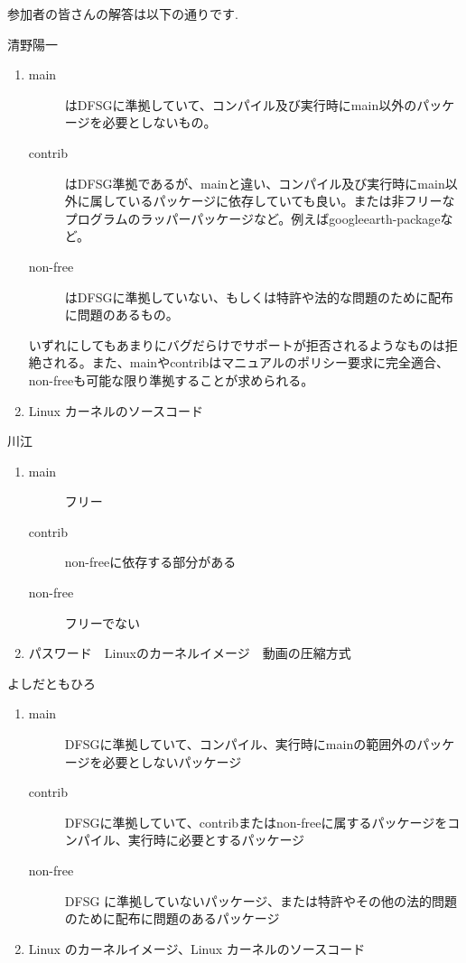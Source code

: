 \documentclass[mingoth,a4paper]{jsarticle}
\begin{document}
参加者の皆さんの解答は以下の通りです.

\begin{prework}{  清野陽一 }
  \begin{enumerate}
  \item
    \begin{description}
    \item [main]はDFSGに準拠していて、コンパイル及び実行時にmain以外のパッケージを必要としないもの。
    \item [contrib]はDFSG準拠であるが、mainと違い、コンパイル及び実行時にmain以外に属しているパッケージに依存していても良い。または非フリーなプログラムのラッパーパッケージなど。例えばgoogleearth-packageなど。
    \item [non-free]はDFSGに準拠していない、もしくは特許や法的な問題のために配布に問題のあるもの。
    \end{description}
    いずれにしてもあまりにバグだらけでサポートが拒否されるようなものは拒絶される。また、mainやcontribはマニュアルのポリシー要求に完全適合、non-freeも可能な限り準拠することが求められる。
  \item Linux カーネルのソースコード
  \end{enumerate}
\end{prework}

\begin{prework}{ 川江 }
  \begin{enumerate}
  \item 
    \begin{description}
    \item [main] フリー
    \item [contrib] non-freeに依存する部分がある
    \item [non-free] フリーでない
    \end{description}
  \item パスワード　Linuxのカーネルイメージ　動画の圧縮方式
  \end{enumerate}
\end{prework}

\clearpage

\begin{prework}{ よしだともひろ }
  \begin{enumerate}
  \item
    \begin{description}
    \item [main] DFSGに準拠していて、コンパイル、実行時にmainの範囲外のパッケージを必要としないパッケージ
    \item [contrib] DFSGに準拠していて、contribまたはnon-freeに属するパッケージをコンパイル、実行時に必要とするパッケージ
    \item [non-free] DFSG に準拠していないパッケージ、または特許やその他の法的問題のために配布に問題のあるパッケージ
    \end{description}
  \item Linux のカーネルイメージ、Linux カーネルのソースコード
  \end{enumerate}
\end{prework}
\end{document}
